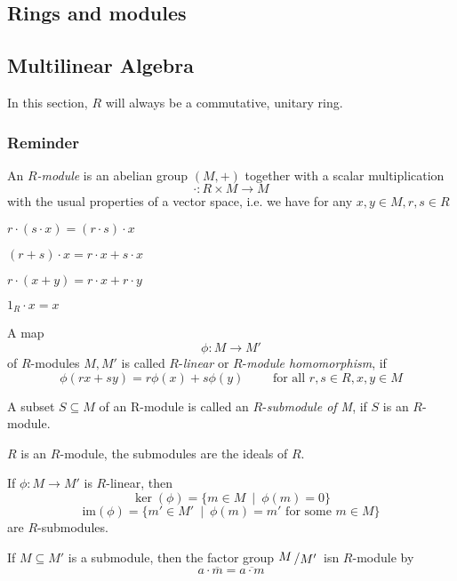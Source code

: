 \documentclass[12pt]{book}
\newcommand{\slant}[2]{{\raisebox{.1em}{$#1$}\left/\raisebox{-.1em}{$#2$}\right.}}
\begin{document}
\begin{spacing}{1.3}
\chapter{Rings and modules}
\thispagestyle{empty}

\setcounter{section}{10}
\renewcommand*\thesection{§ \arabic{section}\quad }
\section{Multilinear Algebra}
\renewcommand*\thesection{\arabic{section}}

In this section, $R$ will always be a commutative, unitary ring.

\subsection{Reminder} %
\begin{compactenum}
\item An $R$\textit{-module} is an abelian group $(M,+)$ together with a scalar multiplication
$$\cdot: R \times M \longrightarrow M$$
with the usual properties of a vector space, i.e. we have for any $x,y \in M, r,s \in R$
\begin{compactenum}
\item $r \cdot (s \cdot x)= (r \cdot s) \cdot x$
\item $(r+s)\cdot x= r\cdot x + s \cdot x$
\item $r \cdot (x+y)=r \cdot x + r \cdot y$
\item $1_R \cdot x = x$
\end{compactenum}
\item A map
$$\phi:M \longrightarrow M'$$
of $R$-modules $M, M'$ is called $R$-\textit{linear} or $R$-\textit{module homomorphism}, if 
$$\phi(rx+sy)=r \phi(x)+s\phi(y) \qquad \textrm{ for all } r,s \in R, x,y \in M$$
\item  A subset $S\subseteq M$ of an R-module is called an $R$-\textit{submodule of M}, if $S$ is an $R$-module.
\item $R$ is an $R$-module, the submodules are the ideals of $R$.
\item If $\phi:M \longrightarrow M'$ is $R$-linear, then 
$$\ker(\phi)= \{m \in M\ \mid\ \phi(m)=0\}$$
$$\textrm{im}(\phi)=\{m' \in M'\ \mid\ \phi(m)=m' \textrm{ for some } m \in M\}$$
are $R$-submodules.
\item If $M \subseteq M'$ is a submodule, then the factor group $\slant{M}{M'}$ isn $R$-module by
$$a \cdot \overline{m}= \overline{a\cdot m}$$

\end{compactenum}
\end{spacing}
\end{document}
